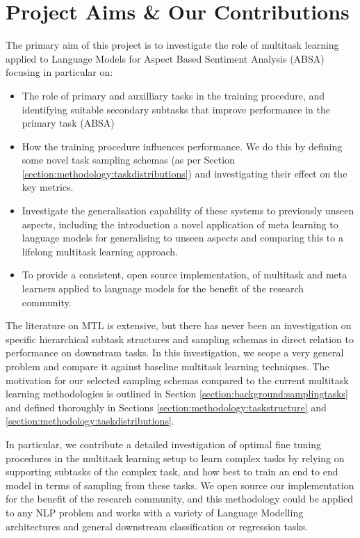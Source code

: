 \section{Project Aims \& Our Contributions} \label{section:intro:projectaims}
The primary aim of this project is to investigate the role of multitask learning applied to Language Models for Aspect Based Sentiment Analysis (ABSA) focusing in particular on:
\begin{itemize}
	\item The role of primary and auxilliary tasks in the training procedure, and identifying suitable secondary subtasks that improve performance in the primary task (ABSA)
	\item How the training procedure influences performance. We do this by defining some novel task sampling schemas (as per Section \ref{section:methodology:taskdistributions}) and investigating their effect on the key metrics.
	\item Investigate the generalisation capability of these systems to previously unseen aspects, including the  introduction a novel application of meta learning to language models for generalising to unseen aspects and comparing this to a lifelong multitask learning approach.
	\item To provide a consistent, open source implementation, of multitask and meta learners applied to language models for the benefit of the research community.
\end{itemize}

The literature on MTL is extensive, but there has never been an investigation on specific hierarchical subtask structures and sampling schemas in direct relation to performance on downstram tasks. In this investigation, we scope a very general problem and compare it against baseline multitask learning techniques. The motivation for our selected sampling schemas compared to the current multitask learning methodologies is outlined in Section \ref{section:background:samplingtasks} and defined thoroughly in Sections \ref{section:methodology:taskstructure} and \ref{section:methodology:taskdistributions}.

In particular, we contribute a detailed investigation of optimal fine tuning procedures in the multitask learning setup to learn complex tasks by relying on supporting subtasks of the complex task, and how best to train an end to end model in terms of sampling from these tasks. We open source our implementation for the benefit of the research community, and this methodology could be applied to any NLP problem and works with a variety of Language Modelling architectures and general downstream classification or regression tasks.

